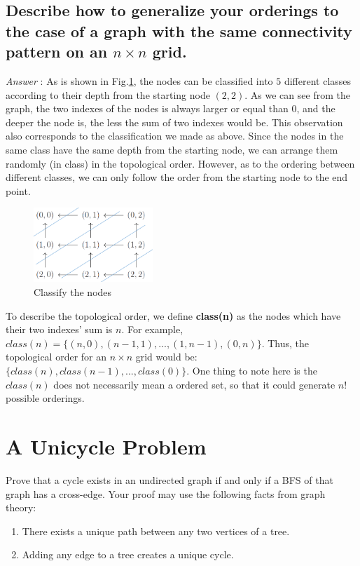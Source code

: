 \documentclass[11pt]{article}
\begin{document}
\subsection{Describe how to generalize your orderings to the case of a graph with the same connectivity pattern on an $n\times n$ grid.}
\noindent\emph{Answer} : As is shown in Fig.\ref{fig:fig5}, the nodes can be classified into $5$ different classes according to their depth from the starting node ${(2,2)}$. As we can see from the graph, the two indexes of the nodes is always larger or equal than $0$, and the deeper the node is, the less the sum of two indexes would be. This observation also corresponds to the classification we made as above. Since the nodes in the same class have the same depth from the starting node, we can arrange them randomly (in class) in the topological order. However, as to the ordering between different classes, we can only follow the order from the starting node to the end point. 
\begin{figure}[h]
	\centering
	\includegraphics[width=0.4\textwidth]{Figure/2_1.png}
	\caption{Classify the nodes}
	\label{fig:fig5}
\end{figure}

To describe the topological order, we define \textbf{class(n)} as the nodes which have their two indexes' sum is $n$. For example, $class(n) = \{(n,0),(n-1,1),...,(1,n-1),(0,n)\}$. Thus, the topological order for an $n\times n$ grid would be: $\{class(n),class(n-1),...,class(0)\}$. One thing to note here is the $class(n)$ does not necessarily mean a ordered set, so that it could generate $n!$ possible orderings. 

\section{A Unicycle Problem}

Prove that a cycle exists in an undirected graph if and only if a BFS of that graph has a cross-edge. Your proof may use the following facts from graph theory:
\begin{enumerate}
	\item There exists a unique path between any two vertices of a tree.
	\item Adding any edge to a tree creates a unique cycle.
\end{enumerate}
\end{document}
